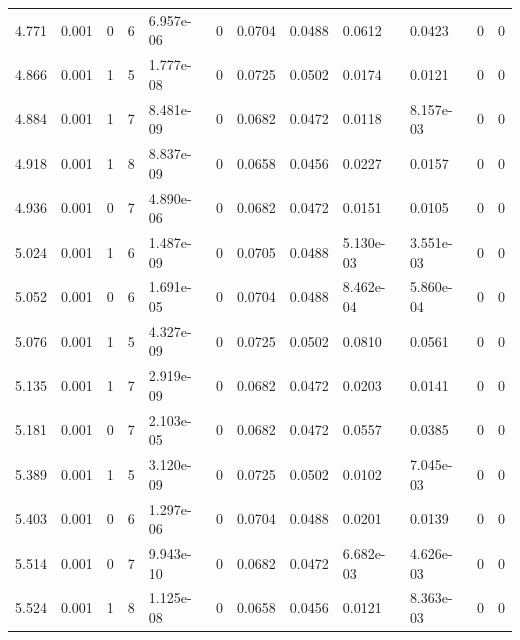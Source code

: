 \documentclass[preview]{standalone}
\begin{document}
{{{\begin{tabular}{L{1.2cm}C{1.2cm} C{0.3cm}C{0.5cm} C{1.4cm}C{1.4cm} C{1.4cm}C{1.4cm} C{1.6cm}C{1.6cm} C{1.6cm}C{1.6cm}}
  4.771  &  0.001  & 0     &  6 &  6.957e-06  & 0  &  0.0704&   0.0488& 0.0612 & 0.0423   &  0 & 0  \\ 
  4.866  &  0.001  & 1     &  5 &  1.777e-08  & 0  &  0.0725&   0.0502& 0.0174 & 0.0121   &  0 & 0  \\ 
  4.884  &  0.001  & 1     &  7 &  8.481e-09  & 0  &  0.0682&   0.0472& 0.0118 & 8.157e-03   &  0 & 0  \\ 
  4.918  &  0.001  & 1     &  8 &  8.837e-09  & 0  &  0.0658&   0.0456& 0.0227 & 0.0157   &  0 & 0  \\ 
  4.936  &  0.001  & 0     &  7 &  4.890e-06  & 0  &  0.0682&   0.0472& 0.0151 & 0.0105   &  0 & 0  \\ 
  5.024  &  0.001  & 1     &  6 &  1.487e-09  & 0  &  0.0705&   0.0488& 5.130e-03 & 3.551e-03   &  0 & 0  \\ 
  5.052  &  0.001  & 0     &  6 &  1.691e-05  & 0  &  0.0704&   0.0488& 8.462e-04 & 5.860e-04   &  0 & 0  \\ 
  5.076  &  0.001  & 1     &  5 &  4.327e-09  & 0  &  0.0725&   0.0502& 0.0810 & 0.0561   &  0 & 0  \\ 
  5.135  &  0.001  & 1     &  7 &  2.919e-09  & 0  &  0.0682&   0.0472& 0.0203 & 0.0141   &  0 & 0  \\ 
  5.181  &  0.001  & 0     &  7 &  2.103e-05  & 0  &  0.0682&   0.0472& 0.0557 & 0.0385   &  0 & 0  \\ 
  5.389  &  0.001  & 1     &  5 &  3.120e-09  & 0  &  0.0725&   0.0502& 0.0102 & 7.045e-03   &  0 & 0  \\ 
  5.403  &  0.001  & 0     &  6 &  1.297e-06  & 0  &  0.0704&   0.0488& 0.0201 & 0.0139   &  0 & 0  \\ 
  5.514  &  0.001  & 0     &  7 &  9.943e-10  & 0  &  0.0682&   0.0472& 6.682e-03 & 4.626e-03   &  0 & 0  \\ 
  5.524  &  0.001  & 1     &  8 &  1.125e-08  & 0  &  0.0658&   0.0456& 0.0121 & 8.363e-03   &  0 & 0  \\ 
\hline 
\end{tabular} 

}}}
\end{document}
